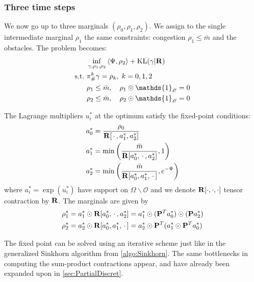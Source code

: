 \documentclass[../report.tex]{subfiles}
\begin{document}
\subsubsection{Three time steps}

We now go up to three marginals $(\rho_0,\rho_1,\rho_2)$. We assign to the single intermediate marginal $\rho_1$ the same constraints: congestion $\rho_1 \leq \bar{m}$ and the obstacles. The problem becomes:
\begin{equation}
\begin{aligned}
	&\inf_{\gamma,\rho_1,\rho_2}{} \langle \Psi, \rho_2\rangle + \KL(\gamma | \bfR) \\
	\suchthat \ & \pi^k_\#\gamma = \rho_k,\; k = 0,1,2 \\
	& \rho_1 \leq \bar{m}, \quad \rho_1\odot\mathds{1}_{\mathscr O} = 0\\
	& \rho_2 \leq \bar{m}, \quad \rho_2\odot\mathds{1}_{\mathscr O} = 0
\end{aligned}
\end{equation}

\begin{prop}
The Lagrange multipliers $u_i^*$ at the optimum satisfy the fixed-point conditions:
\begin{align*}
	&a_0^* = \frac{\rho_0}{\mathbf{R}[\,\cdot\,, a_1^*, a_2^*]} \\
	&a_1^* = \min\left(
	\frac{\bar{m}}{\mathbf{R}[a_0^*, \,\cdot\,, a_2^*]}, 1\right) \\
	&a_2^* = \min\left(
	\frac{\bar{m}}{\mathbf{R}[a_0^*, a_1^*, \,\cdot\,]}, e^{-\Psi}
	\right)
\end{align*}
where $a_i^* = \exp(u_i^*)$ have support on $\Omega\backslash\mathscr{O}$ and we denote $\mathbf{R}[\cdot,\cdot,\cdot]$ tensor contraction by $\mathbf{R}$.
The marginals are given by
\[
\begin{aligned}
	\rho_1^* &=
	a_1^* \odot
	\mathbf{R}[a_0^*, \,\cdot\,, a_2^*] =
	a_1^* \odot
	(\mathbf{P}^Ta_0^*) \odot
	(\mathbf{P}a_2^*) \\
	\rho_2^* &= 
	a_2^* \odot \mathbf{R}[a_0^*, a_1^*, \,\cdot\,]
	= a_2^* \odot
	\mathbf{P}^T
	(a_1^* \odot \mathbf{P}^Ta_0^*)
\end{aligned}
\]
\end{prop}



The fixed point can be solved using an iterative scheme just like in the generalized Sinkhorn algorithm from \cref{algo:Sinkhorn}.
The same bottlenecks in computing the sum-product contractions appear, and have already been expanded upon in \cref{sec:PartialDiscret}.
\end{document}
